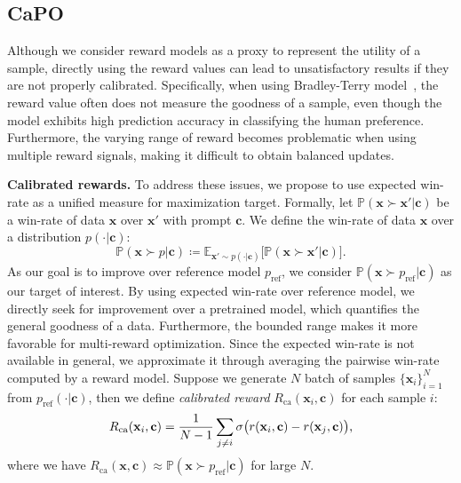 \subsection{CaPO}\label{sec:capo}
Although we consider reward models as a proxy to represent the utility of a sample, directly using the reward values can lead to unsatisfactory results if they are not properly calibrated. 
Specifically, when using Bradley-Terry model~\citep{bradley1952rank}, the reward value often does not measure the goodness of a sample, even though the model exhibits high prediction accuracy in classifying the human preference. 
Furthermore, the varying range of reward becomes problematic when using multiple reward signals, making it difficult to obtain balanced updates. 

\vspace{1mm}
\noindent
{\bf Calibrated rewards.}
To address these issues, we propose to use expected win-rate as a unified measure for maximization target. 
Formally, let $\mathbb{P}(\mathbf{x} \succ \mathbf{x}' | \mathbf{c})$ be a win-rate of data $\mathbf{x}$ over $\mathbf{x}'$ with prompt $\mathbf{c}$. 
We define the win-rate of data $\mathbf{x}$ over a distribution $p(\cdot | \mathbf{c})$:
\begin{equation}\label{eq:winrate}
    \mathbb{P}(\mathbf{x} \succ p | \mathbf{c}) \coloneqq \mathbb{E}_{\mathbf{x}' \sim p(\cdot | \mathbf{c})}\big[\mathbb{P}(\mathbf{x} \succ \mathbf{x}'|\mathbf{c})\big]\text{.}
\end{equation}
As our goal is to improve over reference model $p_{\textrm{ref}}$, we consider $\mathbb{P}(\mathbf{x} \succ p_{\textrm{ref}}|\mathbf{c})$ as our target of interest. 
By using expected win-rate over reference model, we directly seek for improvement over a pretrained model, which quantifies the general goodness of a data. Furthermore, the bounded range makes it more favorable for multi-reward optimization.
Since the expected win-rate is not available in general,
we approximate it through averaging the pairwise win-rate computed by a reward model.
Suppose we generate $N$ batch of samples $\{\mathbf{x}_i\}_{i=1}^N$ from $p_{\textrm{ref}}(\cdot|\mathbf{c})$, then we define \emph{calibrated reward} $R_{\textrm{ca}}(\mathbf{x}_i, \mathbf{c})$ for each sample $i$:
\begin{equation}\label{eq:calre}
\vspace{-3mm}
    R_{\textrm{ca}}(\mathbf{x}_i, \mathbf{c}) = \frac{1}{N-1} \sum_{j\neq i} \sigma \big( r(\mathbf{x}_i, \mathbf{c}) - r(\mathbf{x}_j, \mathbf{c}) \big)\text{,}
\end{equation}
where we have $R_{\textrm{ca}}(\mathbf{x}, \mathbf{c}) \approx \mathbb{P}(\mathbf{x}\succ p_{\textrm{ref}}|\mathbf{c})$ for large $N$.

